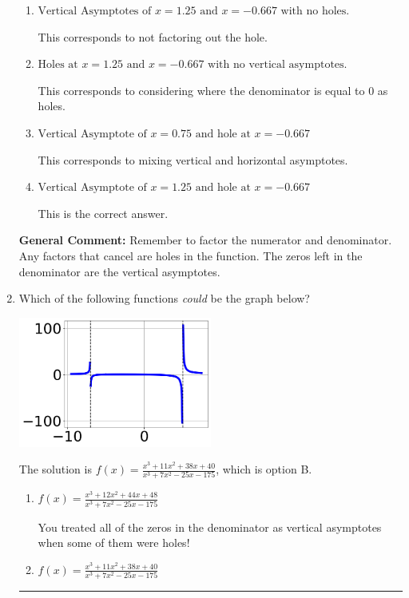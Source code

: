 \documentclass{extbook}[14pt]
\newcommand{\litem}[1]{\item #1

\rule{\textwidth}{0.4pt}}
\begin{document}
\begin{enumerate}
{\begin{enumerate}[label=\Alph*.]
This corresponds to setting the numerator equal to 0.
\item \( \text{Vertical Asymptotes of } x = 1.25 \text{ and } x = -0.667 \text{ with no holes.} \)

This corresponds to not factoring out the hole.
\item \( \text{Holes at } x = 1.25 \text{ and } x = -0.667 \text{ with no vertical asymptotes.} \)

This corresponds to considering where the denominator is equal to 0 as holes.
\item \( \text{Vertical Asymptote of } x = 0.75 \text{ and hole at } x = -0.667 \)

This corresponds to mixing vertical and horizontal asymptotes.
\item \( \text{Vertical Asymptote of } x = 1.25 \text{ and hole at } x = -0.667 \)

This is the correct answer.
\end{enumerate}

\textbf{General Comment:} Remember to factor the numerator and denominator. Any factors that cancel are holes in the function. The zeros left in the denominator are the vertical asymptotes.
}
\litem{
Which of the following functions \textit{could} be the graph below?

\begin{center}
    \includegraphics[width=0.5\textwidth]{../Figures/identifyGraphOfRationalFunctionB.png}
\end{center}


The solution is \( f(x)=\frac{x^{3} +11 x^{2} +38 x + 40}{x^{3} +7 x^{2} -25 x -175} \), which is option B.\begin{enumerate}[label=\Alph*.]
\item \( f(x)=\frac{x^{3} +12 x^{2} +44 x + 48}{x^{3} +7 x^{2} -25 x -175} \)

You treated all of the zeros in the denominator as vertical asymptotes when some of them were holes!
\item \( f(x)=\frac{x^{3} +11 x^{2} +38 x + 40}{x^{3} +7 x^{2} -25 x -175} \)


\end{enumerate}}
\end{enumerate}
\end{document}
